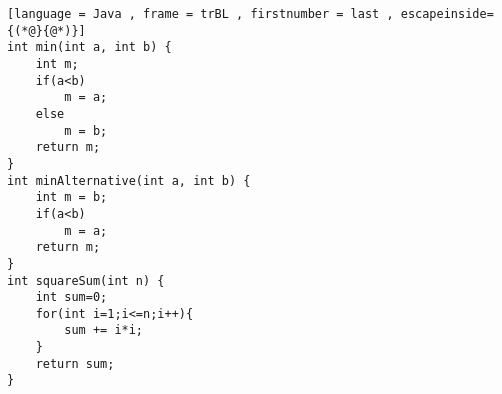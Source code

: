 
\begin{lstlisting}[language = Java , frame = trBL , firstnumber = last , escapeinside={(*@}{@*)}]
int min(int a, int b) {
    int m;
    if(a<b)
        m = a;
    else
        m = b;
    return m;
}
int minAlternative(int a, int b) {
    int m = b;
    if(a<b)
        m = a;
    return m;
}
int squareSum(int n) {
    int sum=0;
    for(int i=1;i<=n;i++){
        sum += i*i;
    }
    return sum;
}
\end{lstlisting}